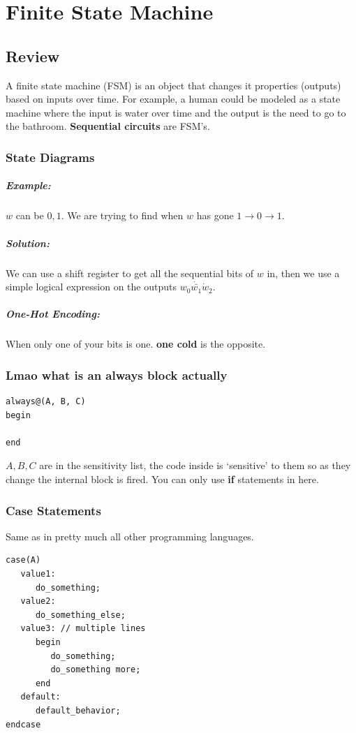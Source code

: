 \documentclass[a4paper,12pt]{report}
\begin{document}
\chapter{Finite State Machine}
\section{Review}
A finite state machine (FSM) is an object that changes it properties (outputs) 
based on inputs over time. For example, a human could be modeled as a state machine 
where the input is water over time and the output is the need to go to the bathroom. 
\textbf{Sequential circuits} are FSM's.

\subsection{State Diagrams}
\paragraph{Example: } $w$ can be $0, 1$. We are trying to find when $w$ has gone 
$1 \to 0 \to 1$. 
\paragraph{Solution: } We can use a shift register to get all 
the sequential bits of $w$ in, then we use a simple logical expression on the outputs
$w_0 \dot \bar{w_1} \dot w_2$. 

\paragraph{One-Hot Encoding: } When only one of your bits is one. \textbf{one cold} 
is the opposite.

\subsection{Lmao what is an always block actually}
\begin{lstlisting}
always@(A, B, C)
begin

end
\end{lstlisting}
$A, B, C$ are in the sensitivity list, the code inside is `sensitive' to them so 
as they change the internal block is fired. You can only use \textbf{if} statements 
in here. 

\subsection{Case Statements}
Same as in pretty much all other programming languages. 
\begin{lstlisting}
case(A)
   value1:
      do_something;
   value2: 
      do_something_else;
   value3: // multiple lines
      begin
         do_something;
         do_something more;
      end
   default:
      default_behavior;
endcase
\end{lstlisting}
\end{document}
